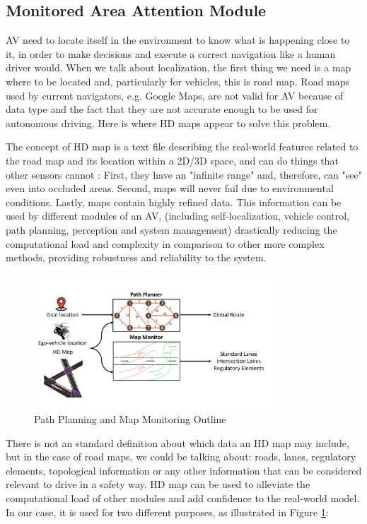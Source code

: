 \subsection{Monitored Area Attention Module}
\label{subsec:4_maam}

AV need to locate itself in the environment to know what is happening close to it, in order to  make decisions and execute a correct navigation like a human driver would. When we talk about localization, the first thing we need is a map where to be located and, particularly for vehicles, this is road map. Road maps used by current navigators, e.g. Google Maps, are not valid for AV because of data type and the fact that they are not accurate enough to be used for autonomous driving. Here is where HD maps appear to solve this problem.

The concept of HD map is a text file describing the real-world features related to the road map and its location within a 2D/3D space,  and can do things that other sensors cannot \cite{wong2020mapping}: First, they have an "infinite range" and, therefore, can "see" even into occluded areas. Second, maps will never fail due to environmental conditions. Lastly, maps contain highly refined data. This information can be used by different modules of an AV, (including self-localization, vehicle control, path planning, perception and system management) drastically reducing the computational load and complexity in comparison to other more complex methods, providing robustness and reliability to the system.

\begin{figure}[] 
	\centering
	\includegraphics[width=0.8\textwidth]{figures/4_path_planner_map_monitor.pdf}
	\caption{Path Planning and Map Monitoring Outline}
	\label{fig:4_path_planner_map_monitor}
\end{figure}

There is not an standard definition about which data an HD map may include, but in the case of road maps, we could be talking about: roads, lanes, regulatory elements, topological information or any other information that can be considered relevant to drive in a safety way. HD map can be used to alleviate the computational load of other modules and add confidence to the real-world model. In our case, it is used for two different purposes, as illustrated in Figure \ref{fig:4_path_planner_map_monitor}: 

